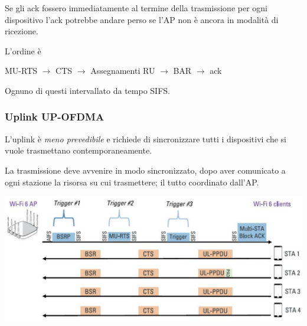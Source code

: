 Se gli ack fossero immediatamente al termine della trasmissione per ogni dispositivo l'ack potrebbe andare perso se l'AP non è ancora in modalità di ricezione.

L'ordine è
\begin{center}
    MU-RTS $\rightarrow$ CTS $\rightarrow$ Assegnamenti RU $\rightarrow$ BAR $\rightarrow$ ack
\end{center}
Ognuno di questi intervallato da tempo SIFS.

\subsubsection{Uplink UP-OFDMA}

L'uplink è \textit{meno prevedibile} e richiede di sincronizzare tutti i dispositivi che si vuole trasmettano contemporaneamente. 

La trasmissione deve avvenire in modo sincronizzato, dopo aver comunicato a ogni stazione la risorsa su cui trasmettere; il tutto coordinato dall'AP.
\begin{center}
	\includegraphics[width=0.95\linewidth]{img/wlan/uplink}
\end{center}

